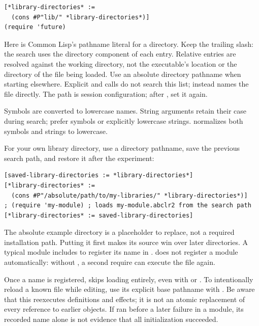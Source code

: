 \begin{codeblock}
\begin{lstlisting}
[*library-directories* :=
  (cons #P"lib/" *library-directories*)]
(require 'future)
\end{lstlisting}
\end{codeblock}

Here  is Common Lisp's pathname literal for a directory.
Keep the trailing slash: the search uses the directory component of
each entry. Relative entries are resolved against the working directory,
not the executable's location or the directory of the file being loaded.
Use an absolute directory pathname when starting elsewhere.
Explicit  and  calls do not search this list;
 instead names the file directly.
The path is session configuration; after , set it again.

Symbols are converted to lowercase names. String arguments retain their
case during search; prefer symbols or explicitly lowercase strings.
 normalizes both symbols and strings to lowercase.

For your own library directory, use a directory pathname, save the
previous search path, and restore it after the experiment:

\begin{codeblock}
\begin{lstlisting}
[saved-library-directories := *library-directories*]
[*library-directories* :=
  (cons #P"/absolute/path/to/my-libraries/" *library-directories*)]
; (require 'my-module) ; loads my-module.abclr2 from the search path
[*library-directories* := saved-library-directories]
\end{lstlisting}
\end{codeblock}

The absolute example directory is a placeholder to replace, not a
required installation path.
Putting it first makes its source win over later directories. A typical
module includes  to register its name in
.  does not register a module automatically:
without , a second require can execute the file again.

Once a name is registered,  skips loading entirely, even
with  or . To intentionally reload
a known file while editing, use its explicit base pathname with
. Be aware that this reexecutes definitions and effects;
it is not an atomic replacement of every reference to earlier objects.
If  ran before a later failure in a module, its recorded
name alone is not evidence that all initialization succeeded.

